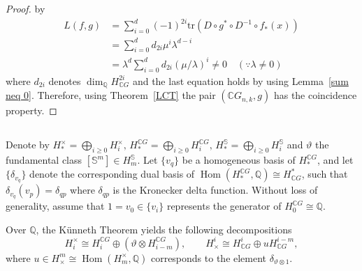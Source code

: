 \documentclass{amsart}
\newcommand{\thmref}[1]{Theorem~\ref{#1}}
\newcommand{\lemref}[1]{Lemma~\ref{#1}}
\begin{document}
\begin{proof}
by
		\[
		\begin{array}{ll}
			L(f,g) &= \sum_{i=0}^d (-1)^{2i}
			\mathrm{tr}(D\circ g^*\circ D^{-1}\circ f_*(x)) \\[6pt]
			&=  \sum_{i=0}^d d_{2i}\mu^i\lambda^{d-i}  \\[6pt]
			&= \lambda^d \sum_{i=0}^d d_{2i}(\mu/\lambda)^i \neq 0 \quad (\because \lambda\neq 0) 
		\end{array}
		\]
		where %
$d_{2i}$ %
denotes $\dim_{\mathbb Q}H^{2i}_{\mathbb CG}$ and %
the last equation holds by using \lemref{sum neq 0}. Therefore, using \thmref{LCT} the pair $(\mathbb{C}G_{n,k},g)$ has the coincidence property.
	\end{proof}
	
	\subsection{} Denote by $H_*^\times = \bigoplus_{i\geq 0} H_i^{\times},\, H_*^{\mathbb{C}G} = \bigoplus_{i\geq 0} H_i^{\mathbb{C}G},\, H_*^{\mathbb{S}} = \bigoplus_{i\geq 0} H_i^{\mathbb{S}}$ and $\vartheta$ the fundamental class $[\mathbb S^m]\in H_m^{\mathbb S}$. Let $\{v_q\}$ be a homogeneous basis of $H_*^{\mathbb{C}G}$, and let $\{\delta_{v_q}\}$ denote the corresponding dual basis of  
$\operatorname{Hom}(H_*^{\mathbb{C}G}, \mathbb Q) \cong H^*_{\mathbb{C}G}$, such %
that  
	$ \delta_{v_q} (v_p) = \delta_{qp}$ where %
$\delta_{qp}$ is the Kronecker delta function. Without loss of generality, assume that $1=v_0 \in \{v_i\}$ represents the generator of $H_0^{\mathbb{C}G} \cong \mathbb Q$.
	
	Over $\mathbb Q$, the K\"unneth Theorem yields the following decompositions 
	\begin{equation}\label{kunneth}
		H_i^\times \cong H_i^{\mathbb{C}G} \oplus (\vartheta \otimes H_{i-m}^{\mathbb{C}G}), 
		\qquad 
		H^i_\times \cong H^i_{\mathbb{C}G} \oplus uH^{i-m}_{\mathbb{C}G},
	\end{equation}
	where  $u \in H^m_{\times} \cong \operatorname{Hom}(H_m^{\times}, \mathbb Q)$ corresponds to the element $\delta_{\vartheta\otimes 1}$.
	
\end{document}
